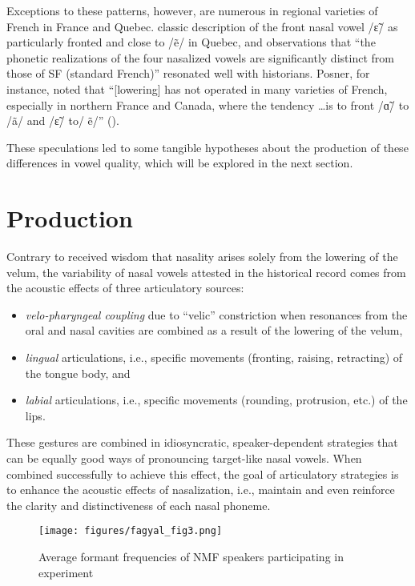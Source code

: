 \documentclass[output=paper,colorlinks,citecolor=brown]{langscibook}
\begin{document}
Exceptions to these patterns, however, are numerous in regional varieties of French in France and Quebec.  classic description of the front nasal vowel /ɛ̃/ as particularly fronted and close to /ẽ/ in Quebec, and  observations that “the phonetic realizations of the four nasalized vowels are significantly distinct from those of SF (standard French)” resonated well with historians. Posner, for instance, noted that “[lowering] has not operated in many varieties of French, especially in northern France and Canada, where the tendency \ldots is to front /ɑ̃/ to /ã/ and /ɛ̃/  to/ ẽ/” (\citealt[235]{Posner1997}).

These speculations led to some tangible hypotheses about the production of these differences in vowel quality, which will be explored in the next section.

\section{Production}
Contrary to received wisdom that nasality arises solely from the lowering of the velum, the variability of nasal vowels attested in the historical record comes from the acoustic effects of three articulatory sources:
\begin{itemize}
    \item \textit{velo-pharyngeal coupling} due to “velic” constriction when resonances from the oral and nasal cavities are combined as a result of the lowering of the velum,
    \item \textit{lingual} articulations, i.e., specific movements (fronting, raising, retracting) of the tongue body, and
    \item \textit{labial} articulations, i.e., specific movements (rounding, protrusion, etc.) of the lips.
\end{itemize}

These gestures are combined in idiosyncratic, speaker-dependent strategies that can be equally good ways of pronouncing target-like nasal vowels. When combined successfully to achieve this effect, the goal of articulatory strategies is to enhance the acoustic effects of nasalization, i.e., maintain and even reinforce the clarity and distinctiveness of each nasal phoneme.

\begin{figure}
    \texttt{[image: figures/fagyal\_fig3.png]}
    \caption{Average formant frequencies of NMF speakers participating in  experiment \citep[][1209]{NicholasCarignan2019}}
    \label{fig:3}
\end{figure}
\end{document}
